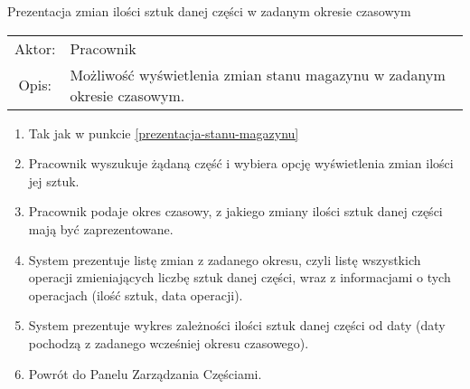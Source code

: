   \item Prezentacja zmian ilości sztuk danej części w zadanym okresie czasowym \\
  \begin{tabularx}{\linewidth}{ c X }
  Aktor: & Pracownik \\
  Opis: & Możliwość wyświetlenia zmian stanu magazynu w zadanym okresie czasowym.\\
  \end{tabularx}
   \begin{enumerate}
    \item Tak jak w punkcie \ref{prezentacja-stanu-magazynu}
    \item Pracownik wyszukuje żądaną część i wybiera opcję wyświetlenia zmian ilości jej sztuk.
    \item Pracownik podaje okres czasowy, z jakiego zmiany ilości sztuk danej części mają być zaprezentowane.
    \item System prezentuje listę zmian z zadanego okresu, czyli listę wszystkich operacji zmieniających liczbę sztuk danej części, wraz z informacjami o tych operacjach (ilość sztuk, data operacji).
    \item System prezentuje wykres zależności ilości sztuk danej części od daty (daty pochodzą z zadanego wcześniej okresu czasowego).
    \item Powrót do Panelu Zarządzania Częściami.
  \end{enumerate}